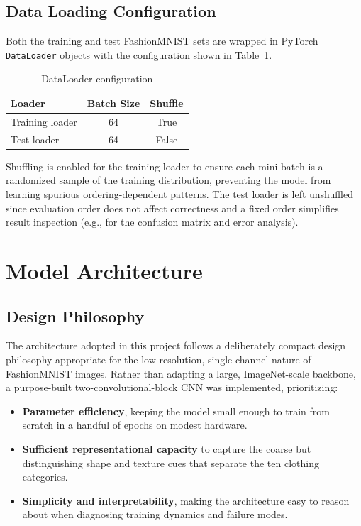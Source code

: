 \documentclass[12pt,a4paper]{report}
\begin{document}
\section{Data Loading Configuration}
Both the training and test FashionMNIST sets are wrapped in PyTorch \texttt{DataLoader} objects with the configuration shown in Table~\ref{tab:loader}.

\begin{table}[H]
\centering
\caption{DataLoader configuration}
\label{tab:loader}
\begin{tabular}{@{}lcc@{}}
\toprule
\textbf{Loader} & \textbf{Batch Size} & \textbf{Shuffle} \\
\midrule
Training loader & 64 & True \\
Test loader     & 64 & False \\
\bottomrule
\end{tabular}
\end{table}

Shuffling is enabled for the training loader to ensure each mini-batch is a randomized sample of the training distribution, preventing the model from learning spurious ordering-dependent patterns. The test loader is left unshuffled since evaluation order does not affect correctness and a fixed order simplifies result inspection (e.g., for the confusion matrix and error analysis).

\chapter{Model Architecture}

\section{Design Philosophy}
The architecture adopted in this project follows a deliberately compact design philosophy appropriate for the low-resolution, single-channel nature of FashionMNIST images. Rather than adapting a large, ImageNet-scale backbone, a purpose-built two-convolutional-block CNN was implemented, prioritizing:

\begin{itemize}
    \item \textbf{Parameter efficiency}, keeping the model small enough to train from scratch in a handful of epochs on modest hardware.
    \item \textbf{Sufficient representational capacity} to capture the coarse but distinguishing shape and texture cues that separate the ten clothing categories.
    \item \textbf{Simplicity and interpretability}, making the architecture easy to reason about when diagnosing training dynamics and failure modes.
\end{itemize}
\end{document}
